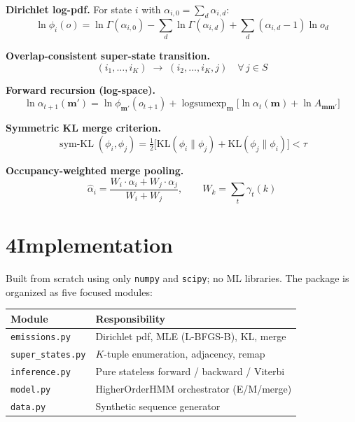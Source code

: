 \documentclass[10pt,a4paper,twocolumn]{article}
\DeclareMathOperator{\logsumexp}{logsumexp}
\DeclareMathOperator{\symKL}{sym\text{-}KL}
\begin{document}
\textbf{Dirichlet log-pdf.}\; For state $i$ with $\alpha_{i,0}=\sum_d\alpha_{i,d}$:
\begin{equation}
  \ln\phi_i(o) = \ln\Gamma(\alpha_{i,0})
               - \sum_d \ln\Gamma(\alpha_{i,d})
               + \sum_d (\alpha_{i,d}-1)\ln o_d
\end{equation}

\textbf{Overlap-consistent super-state transition.}
\begin{equation}
  (i_1,\ldots,i_K) \;\longrightarrow\; (i_2,\ldots,i_K,j)
  \quad \forall\, j \in S
\end{equation}

\textbf{Forward recursion (log-space).}
\begin{equation}
  \ln\alpha_{t+1}(\mathbf{m}') = \ln\phi_{\mathbf{m}'}(o_{t+1})
    + \logsumexp_{\mathbf{m}}\!\Big[
        \ln\alpha_t(\mathbf{m}) + \ln A_{\mathbf{m}\mathbf{m}'}
      \Big]
\end{equation}

\textbf{Symmetric KL merge criterion.}
\begin{equation}
  \symKL(\phi_i,\phi_j)
    = \tfrac{1}{2}\bigl[\mathrm{KL}(\phi_i\|\phi_j)
                       +\mathrm{KL}(\phi_j\|\phi_i)\bigr] < \tau
\end{equation}

\textbf{Occupancy-weighted merge pooling.}
\begin{equation}
  \hat{\alpha}_i = \frac{W_i\cdot\alpha_i + W_j\cdot\alpha_j}{W_i + W_j},
  \qquad W_k = \sum_t \gamma_t(k)
\end{equation}

\section*{4\quad Implementation}

Built from scratch using only \texttt{numpy} and \texttt{scipy}; no ML libraries.
The package is organized as five focused modules:

\smallskip
\begin{center}
\footnotesize
\renewcommand{\arraystretch}{1.1}
\begin{tabular}{@{}ll@{}}
\toprule
\textbf{Module} & \textbf{Responsibility} \\
\midrule
\texttt{emissions.py}    & Dirichlet pdf, MLE (L-BFGS-B), KL, merge \\
\texttt{super\_states.py}& $K$-tuple enumeration, adjacency, remap \\
\texttt{inference.py}    & Pure stateless forward / backward / Viterbi \\
\texttt{model.py}        & HigherOrderHMM orchestrator (E/M/merge) \\
\texttt{data.py}         & Synthetic sequence generator \\
\bottomrule
\end{tabular}
\end{center}
\end{document}
